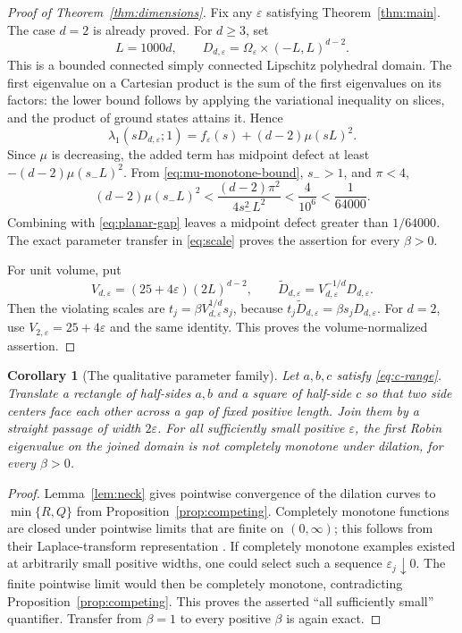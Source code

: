\documentclass[11pt,a4paper]{article}
\newtheorem{corollary}[theorem]{Corollary}
\theoremstyle{definition}\newtheorem{definition}[theorem]{Definition}
\theoremstyle{remark}\newtheorem{remark}[theorem]{Remark}
\begin{document}
\begin{proof}[Proof of Theorem~\ref{thm:dimensions}]
Fix any $\varepsilon$ satisfying Theorem~\ref{thm:main}.
The case $d=2$ is already proved. For $d\ge3$, set
\[
 L=1000d,\qquad
 D_{d,\varepsilon}=\Omega_\varepsilon\times(-L,L)^{d-2}.
\]
This is a bounded connected simply connected Lipschitz
polyhedral domain. The first eigenvalue on a Cartesian product
is the sum of the first eigenvalues on its factors: the lower
bound follows by applying the variational inequality on slices,
and the product of ground states attains it. Hence
\[
 \lambda_1(sD_{d,\varepsilon};1)
 =f_\varepsilon(s)+(d-2)\mu(sL)^2.
\]
Since $\mu$ is decreasing, the added term has midpoint defect
at least $-(d-2)\mu(s_-L)^2$. From
\eqref{eq:mu-monotone-bound}, $s_->1$, and $\pi<4$,
\begin{equation}\label{eq:product-budget}
 (d-2)\mu(s_-L)^2
 <\frac{(d-2)\pi^2}{4s_-^2L^2}
 <\frac{4}{10^6}<\frac1{64000}.
\end{equation}
Combining with \eqref{eq:planar-gap} leaves a midpoint defect
greater than $1/64000$. The exact parameter transfer in
\eqref{eq:scale} proves the assertion for every $\beta>0$.

For unit volume, put
\[
 V_{d,\varepsilon}=(25+4\varepsilon)(2L)^{d-2},\qquad
 \widetilde D_{d,\varepsilon}
       =V_{d,\varepsilon}^{-1/d}D_{d,\varepsilon}.
\]
Then the violating scales are
$t_j=\beta V_{d,\varepsilon}^{1/d}s_j$, because
$t_j\widetilde D_{d,\varepsilon}=\beta s_jD_{d,\varepsilon}$.
For $d=2$, use $V_{2,\varepsilon}=25+4\varepsilon$ and the
same identity. This proves the volume-normalized assertion.
\end{proof}

\begin{corollary}[The qualitative parameter family]\label{cor:family}
Let $a,b,c$ satisfy \eqref{eq:c-range}. Translate a rectangle
of half-sides $a,b$ and a square of half-side $c$ so that two
side centers face each other across a gap of fixed positive
length. Join them by a straight passage of width
$2\varepsilon$. For all sufficiently small positive
$\varepsilon$, the first Robin eigenvalue on the joined domain
is not completely monotone under dilation, for every $\beta>0$.
\end{corollary}
\begin{proof}
Lemma~\ref{lem:neck} gives pointwise convergence of the dilation
curves to $\min\{R,Q\}$ from Proposition~\ref{prop:competing}.
Completely monotone functions are closed under pointwise limits
that are finite on $(0,\infty)$; this follows from their
Laplace-transform representation \cite{SSV2012}.
If completely monotone examples existed at arbitrarily small
positive widths, one could select such a sequence
$\varepsilon_j\downarrow0$. The finite pointwise limit would
then be completely monotone, contradicting
Proposition~\ref{prop:competing}. This proves the asserted
``all sufficiently small'' quantifier. Transfer from $\beta=1$
to every positive $\beta$ is again exact.
\end{proof}
\end{document}
